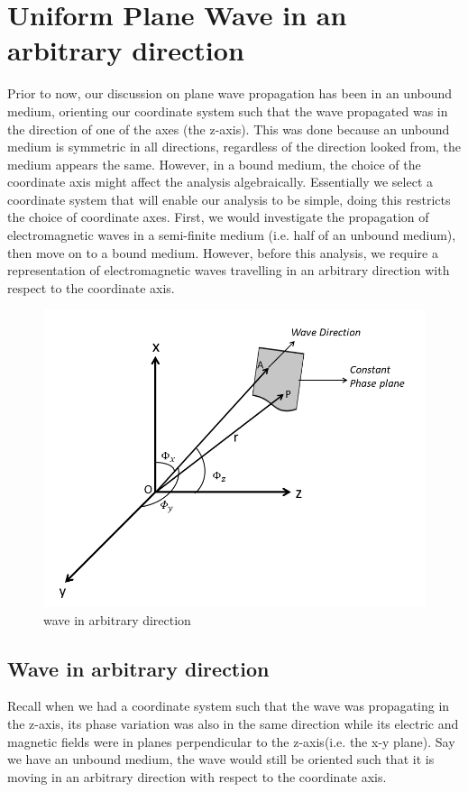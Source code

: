\chapter{Uniform Plane Wave in an arbitrary direction}\label{lec:lec29}

Prior to now, our discussion on plane wave propagation has been in an unbound medium, orienting our coordinate system such that the wave propagated was in the direction of one of the axes (the z-axis). This was done because an unbound medium is symmetric in all directions, regardless of the direction looked from, the medium appears the same.
However, in a bound medium, the choice of the coordinate axis might affect the analysis algebraically.
Essentially we select a coordinate system that will enable our analysis to be simple, doing this restricts the choice of coordinate axes. First, we would investigate the propagation of electromagnetic waves in a semi-finite medium (i.e. half of an unbound medium), then move on to a bound medium. However, before this analysis, we require a representation of electromagnetic waves travelling in an arbitrary direction with respect to the coordinate axis.
\begin{figure}[h]
\centering
\includegraphics[scale=0.43]{./graphics/wave_in_arbitrary_direction}
\caption{wave in arbitrary direction}
\label{fig:wave_in_arbitrary_direction}
\end{figure}

\section{Wave in arbitrary direction}
Recall when we had a coordinate system such that the wave was propagating in the z-axis, its phase variation was also in the same direction while its electric and magnetic fields were in planes perpendicular to the z-axis(i.e. the x-y plane).
Say we have an unbound medium, the wave would still be oriented such that it is moving in an arbitrary direction with respect to the coordinate axis.

